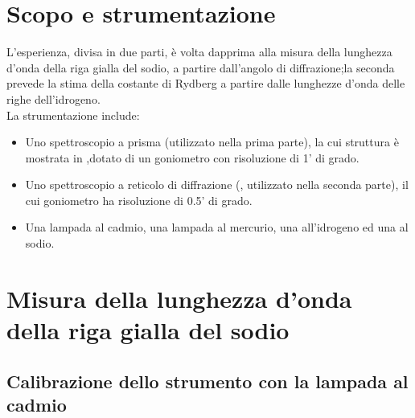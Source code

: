 \section{Scopo e strumentazione}

L'esperienza, divisa in due parti, è volta dapprima alla misura della lunghezza d'onda della riga gialla del sodio, a partire dall'angolo di diffrazione;la seconda prevede la stima della costante di Rydberg a partire dalle lunghezze d'onda delle righe dell'idrogeno.\\ La strumentazione include:
\begin{itemize} 
\item Uno spettroscopio a prisma (utilizzato nella prima parte), la cui struttura è mostrata in ,dotato di un goniometro con risoluzione di 1' di grado.
\item Uno spettroscopio a reticolo di diffrazione (, utilizzato nella seconda parte), il cui goniometro ha risoluzione di 0.5' di grado.
\item Una lampada al cadmio, una lampada al mercurio, una all'idrogeno ed una al sodio.
\end{itemize}



\section{Misura della lunghezza d'onda della riga gialla del sodio}

\subsection{Calibrazione dello strumento con la lampada al cadmio}

